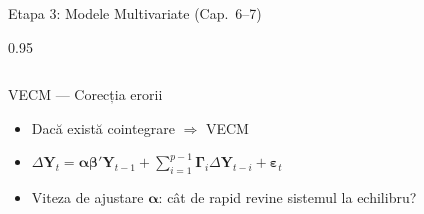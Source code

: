 \documentclass[9pt, aspectratio=169, t]{beamer}
\begin{document}
\begin{frame}{Etapa 3: Modele Multivariate (Cap.\ 6--7)}
\begin{cminipage}{0.95\textwidth}
{\begin{columns}[T]
            \vspace{0.1cm}

            \begin{block}{VECM --- Corecția erorii}
                \begin{itemize}\setlength{\itemsep}{0pt}
                    \item Dacă există cointegrare $\Rightarrow$ VECM
                    \item $\Delta \mathbf{Y}_t = \boldsymbol{\alpha}\boldsymbol{\beta}'\mathbf{Y}_{t-1} + \sum_{i=1}^{p-1}\boldsymbol{\Gamma}_i\Delta\mathbf{Y}_{t-i} + \boldsymbol{\varepsilon}_t$
                    \item Viteza de ajustare $\boldsymbol{\alpha}$: cât de rapid revine sistemul la echilibru?
                \end{itemize}
            \end{block}
        \end{columns}
        }
    \end{cminipage}
\end{frame}
\end{document}
